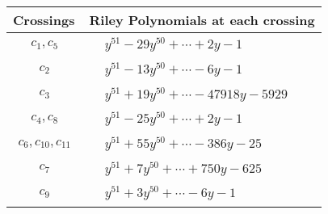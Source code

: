 \documentclass[1p]{elsarticle_modified}
\theoremstyle{definition}
\begin{document}
\begin{tabular}{m{50pt}|m{274pt}}
Crossings & \hspace{64pt}Riley Polynomials at each crossing \\
\hline $$\begin{aligned}c_{1},c_{5}\end{aligned}$$&$\begin{aligned}
&y^{51}-29 y^{50}+\cdots+2 y-1
\end{aligned}$\\
\hline $$\begin{aligned}c_{2}\end{aligned}$$&$\begin{aligned}
&y^{51}-13 y^{50}+\cdots-6 y-1
\end{aligned}$\\
\hline $$\begin{aligned}c_{3}\end{aligned}$$&$\begin{aligned}
&y^{51}+19 y^{50}+\cdots-47918 y-5929
\end{aligned}$\\
\hline $$\begin{aligned}c_{4},c_{8}\end{aligned}$$&$\begin{aligned}
&y^{51}-25 y^{50}+\cdots+2 y-1
\end{aligned}$\\
\hline $$\begin{aligned}c_{6},c_{10},c_{11}\end{aligned}$$&$\begin{aligned}
&y^{51}+55 y^{50}+\cdots-386 y-25
\end{aligned}$\\
\hline $$\begin{aligned}c_{7}\end{aligned}$$&$\begin{aligned}
&y^{51}+7 y^{50}+\cdots+750 y-625
\end{aligned}$\\
\hline $$\begin{aligned}c_{9}\end{aligned}$$&$\begin{aligned}
&y^{51}+3 y^{50}+\cdots-6 y-1
\end{aligned}$\\
\hline
\end{tabular}
\vskip 2pc
\end{document}
